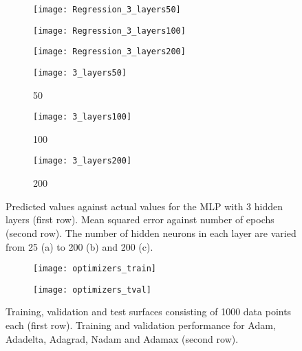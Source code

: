 \documentclass[conference,compsoc]{IEEEtran}
\begin{document}
  
     \begin{figure*}[]
 

        \begin{subfigure}{0.33\linewidth}
            \texttt{[image: Regression\_3\_layers50]}
           
        \end{subfigure}
        \begin{subfigure}{0.33\linewidth}
            \texttt{[image: Regression\_3\_layers100]}
            
        \end{subfigure}
		  \begin{subfigure}{0.33\linewidth}
            \texttt{[image: Regression\_3\_layers200]}
           
        \end{subfigure}


        \begin{subfigure}{0.33\linewidth}
            \texttt{[image: 3\_layers50]}
            \caption{50}
        \end{subfigure}
        \begin{subfigure}{0.33\linewidth}
            \texttt{[image: 3\_layers100]}
            \caption{100}
        \end{subfigure}
		  \begin{subfigure}{0.33\linewidth}
            \texttt{[image: 3\_layers200]}
            \caption{200}
            
        \end{subfigure}
        
	
        \caption{Predicted values against actual values for the MLP with 3 hidden layers (first row). Mean squared error against number of epochs (second row). The number of hidden neurons in each layer are varied from 25 (a) to 200 (b) and 200 (c).}        
                
        \label{fig:reg2}
    \end{figure*}     

\begin{figure*}
\centering
	\begin{subfigure}{6cm}
            \texttt{[image: optimizers\_train]}          
        \end{subfigure}
        \begin{subfigure}{6cm}
            \texttt{[image: optimizers\_tval]}            
        \end{subfigure}  

        \caption{Training, validation and test surfaces consisting of 1000 data points each (first row). Training and validation performance for Adam, Adadelta, Adagrad, Nadam and Adamax (second row). }
                
        \label{fig:surface}
    \end{figure*}
\end{document}
